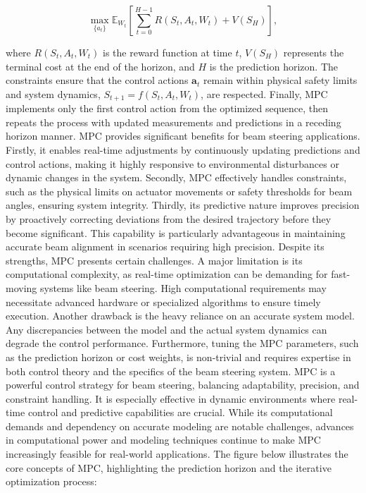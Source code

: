 \documentclass[journal,article,submit,pdftex,moreauthors]{Definitions/mdpi}
\begin{document}
\[
\max_{\{a_t\}} \mathbb{E}_{W_t} \left[ \sum_{t=0}^{H-1} R(S_t, A_t, W_t) + V(S_H) \right],
\]

where $R(S_t, A_t, W_t)$ is the reward function at time $t$, $V(S_H)$ represents the terminal cost at the end of the horizon, and $H$ is the prediction horizon. The constraints ensure that the control actions $\mathbf{a}_t$ remain within physical safety limits and system dynamics, $S_{t+1} = f(S_t, A_t, W_t)$, are respected. Finally, MPC implements only the first control action from the optimized sequence, then repeats the process with updated measurements and predictions in a receding horizon manner. MPC provides significant benefits for beam steering applications. Firstly, it enables real-time adjustments by continuously updating predictions and control actions, making it highly responsive to environmental disturbances or dynamic changes in the system. Secondly, MPC effectively handles constraints, such as the physical limits on actuator movements or safety thresholds for beam angles, ensuring system integrity. Thirdly, its predictive nature improves precision by proactively correcting deviations from the desired trajectory before they become significant. This capability is particularly advantageous in maintaining accurate beam alignment in scenarios requiring high precision. 
Despite its strengths, MPC presents certain challenges. A major limitation is its computational complexity, as real-time optimization can be demanding for fast-moving systems like beam steering. High computational requirements may necessitate advanced hardware or specialized algorithms to ensure timely execution. Another drawback is the heavy reliance on an accurate system model. Any discrepancies between the model and the actual system dynamics can degrade the control performance. Furthermore, tuning the MPC parameters, such as the prediction horizon or cost weights, is non-trivial and requires expertise in both control theory and the specifics of the beam steering system.
MPC is a powerful control strategy for beam steering, balancing adaptability, precision, and constraint handling. It is especially effective in dynamic environments where real-time control and predictive capabilities are crucial. While its computational demands and dependency on accurate modeling are notable challenges, advances in computational power and modeling techniques continue to make MPC increasingly feasible for real-world applications. The figure below illustrates the core concepts of MPC, highlighting the prediction horizon and the iterative optimization process:
\end{document}
